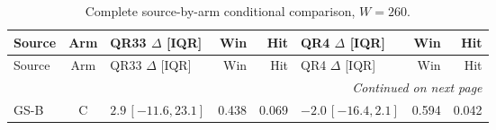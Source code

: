 \begingroup
\fontsize{9}{10.2}\selectfont
\setlength{\tabcolsep}{2.2pt}
\renewcommand{\arraystretch}{1.05}
\setlength{\LTpre}{2pt}
\setlength{\LTpost}{3pt}
\begin{longtable}{lcp{37mm}rrp{37mm}rr}
\caption{Complete source-by-arm conditional comparison, $W=260$.}\label{tab:v9-stability-w260}\\
\toprule
Source & Arm & QR33 $\Delta$ [IQR] & Win & Hit & QR4 $\Delta$ [IQR] & Win & Hit\\
\midrule
\endfirsthead
\toprule
Source & Arm & QR33 $\Delta$ [IQR] & Win & Hit & QR4 $\Delta$ [IQR] & Win & Hit\\
\midrule
\endhead
\midrule
\multicolumn{8}{r}{\emph{Continued on next page}}\\
\endfoot
\bottomrule
\endlastfoot
GS-B & C & \(2.9\,[-11.6,23.1]\) & 0.438 & 0.069 & \(-2.0\,[-16.4,2.1]\) & 0.594 & 0.042\\

\end{longtable}

